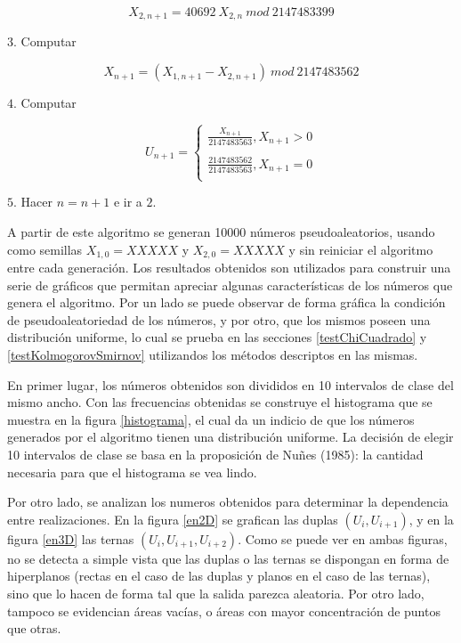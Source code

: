\documentclass{sig-alternate}
\begin{document}
\begin{equation}
\label{LCG2}
X_{2,n+1} = 40692 \ X_{2,n} \ mod \ 2147483399
\end{equation}

$3$. Computar

\begin{equation}
\label{xn}
X_{n+1} = (X_{1,n+1} - X_{2,n+1}) \ mod \ 2147483562
\end{equation}

$4$. Computar

\begin{equation}
\label{un}
U_{n+1} = 
    \begin{cases}
    \frac{X_{n+1}}{2147483563}, X_{n+1} > 0\\
     \ \\
    \frac{2147483562}{2147483563}, X_{n+1} = 0\\
    \end{cases}
\end{equation}

$5$. Hacer $n = n + 1$ e ir a $2$.

A partir de este algoritmo se generan 10000 n\'umeros pseudoaleatorios, usando como semillas $X_{1,0} = XXXXX$ y $X_{2,0} = XXXXX$ y sin reiniciar el algoritmo entre cada generaci\'on. Los resultados obtenidos son utilizados para construir una serie de gr\'aficos que permitan apreciar algunas caracter\'isticas de los n\'umeros que genera el algoritmo. Por un lado se puede observar de forma gr\'afica la condici\'on de pseudoaleatoriedad de los n\'umeros, y por otro, que los mismos poseen una distribuci\'on uniforme, lo cual se prueba en las secciones \ref{testChiCuadrado} y \ref{testKolmogorovSmirnov} utilizandos los m\'etodos descriptos en las mismas.
\par
En primer lugar, los n\'umeros obtenidos son divididos en 10 intervalos de clase del mismo ancho. Con las frecuencias obtenidas se construye el histograma que se muestra en la figura \ref{histograma}, el cual da un indicio de que los n\'umeros generados por el algoritmo tienen una distribuci\'on uniforme. La decisi\'on de elegir 10 intervalos de clase se basa en la proposici\'on de Nu\~nes (1985): la cantidad necesaria para que el histograma se vea lindo.
\par
Por otro lado, se analizan los numeros obtenidos para determinar la dependencia entre realizaciones. En la figura \ref{en2D} se grafican las duplas $(U_i , U_{i+1})$, y en la figura \ref{en3D} las ternas $(U_i, U_{i+1}, U_{i+2})$. Como se puede ver en ambas figuras, no se detecta a simple vista que las duplas o las ternas se dispongan en forma de hiperplanos (rectas en el caso de las duplas y planos en el caso de las ternas), sino que lo hacen de forma tal que la salida parezca aleatoria. Por otro lado, tampoco se evidencian \'areas vac\'ias, o \'areas con mayor concentraci\'on de puntos que otras.
\end{document}
